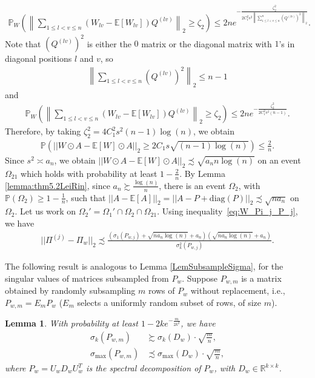 \documentclass{article}
\newtheorem{lemma}{Lemma}
\newcommand{\real}{\mathbb{R}}
\begin{document}
\begin{align*}
\mathbb{P}_W\left(\left\|\sum_{1 \leq l < v \leq n}(W_{lv} - \mathbb{E}[W_{lv}])Q^{(lv)}\right\|_2 \geq \zeta_2\right) \leq 2ne^{-\frac{\zeta_2^2}{2C_1^2s^2\left\|\sum_{1 \leq l < v \leq n}^n(Q^{(lv)})^2\right\|_2}}.
\end{align*}
Note that $(Q^{(lv)})^2$ is either the $0$ matrix or the diagonal matrix with $1$'s in diagonal positions $l$ and $v$, so
\begin{align*}
\left\|\sum_{1 \leq l < v \leq n}(Q^{(lv)})^2\right\|_2 \leq n - 1
\end{align*}
and
\begin{align*}
\mathbb{P}_W\left(\left\|\sum_{1 \leq l < v \leq n}(W_{lv} - \mathbb{E}[W_{lv}])Q^{(lv)}\right\|_2 \geq \zeta_2\right) \leq 2ne^{-\frac{\zeta_2^2}{2C_1^2s^2(n - 1)}}.
\end{align*}
Therefore, by taking $\zeta_2^2 = 4C_1^2s^2(n - 1)\log(n)$, we obtain
\begin{align*}
\mathbb{P}\left(||W \odot A - \mathbb{E}[W]\odot A||_2 \geq 2C_1s\sqrt{(n - 1)\log(n)}\right) \leq \frac{2}{n}.   
\end{align*}
Since $s^2 \asymp a_n$, we obtain $||W \odot A - \mathbb{E}[W]\odot A||_2 \precsim \sqrt{a_n n\log(n)}$ on an event $\Omega_{21}$ which holds with probability at least $1 - \frac{2}{n}$. By Lemma \ref{lemma:thm5.2LeiRin}, since $a_n \succsim \frac{\log(n)}{n}$, there is an event $\Omega_2$, with $\mathbb{P}(\Omega_2) \geq 1 - \frac{1}{n}$, such that $||A - \mathbb{E}[A]||_2 = ||A - P + \text{diag}(P)||_2 \precsim \sqrt{na_n}$ on $\Omega_2$. Let us work on $\Omega_2' = \Omega_1' \cap \Omega_2 \cap \Omega_{21}$. Using inequality~\eqref{eq:W_Pi_j_P_j}, we have
\begin{align*}
||\Pi^{(j)} - \Pi_w||_2 \precsim \frac{(\sigma_1(P_{w, j}) + \sqrt{na_n \log(n)} + a_n)(\sqrt{na_n \log(n)} + a_n)}{\sigma^2_k(P_{w, j})}.
\end{align*}

The following result is analogous to Lemma \ref{LemSubsampleSigma}, for the singular values of matrices subsampled from $P_w$. Suppose $P_{w, m}$ is a matrix obtained by randomly subsampling $m$ rows of $P_w$ without replacement, i.e., $P_{w, m} = E_m P_w$ ($E_m$ selects a uniformly random subset of rows, of size $m$). 
\begin{lemma}
\label{LemSubsampleSigma_weighted}
With probability at least $1 - 2ke^{-\frac{m}{2k^2}}$, we have
\begin{align*}
    \sigma_{k}(P_{w, m}) & \succsim \sigma_{k}(D_w) \cdot \sqrt{\frac{m}{n}}, \\
    \sigma_{\max}(P_{w, m}) & \precsim \sigma_{\max}(D_w) \cdot \sqrt{\frac{m}{n}},
\end{align*}
where $P_w = U_wD_wU_w^T$ is the spectral decomposition of $P_w$, with $D_w \in \real^{k \times k}$.
\end{lemma}
\end{document}
